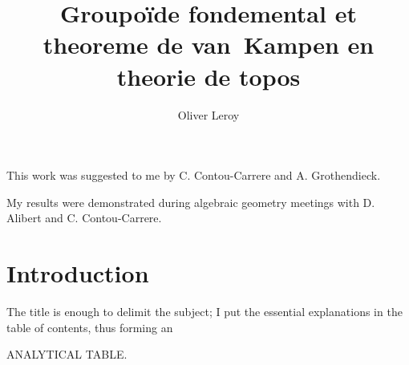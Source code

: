 \documentclass[10pt,oneside]{amsart}
\newcommand{\oldpage}[1]{\marginnote{\textbf{#1}}}
\begin{document}
\title{Groupo\"ide fondemental et theoreme de van~Kampen en theorie de topos}
\author{Oliver Leroy}
\maketitle

\begin{center}
This work was suggested to me by C. Contou-Carrere and A. Grothendieck.

My results were demonstrated during algebraic geometry meetings with D. Alibert and C. Contou-Carrere.
\end{center}

\section*{Introduction}
\oldpage{I}
The title is enough to delimit the subject; I put the essential explanations in the table of contents, thus
forming an
\begin{center}
ANALYTICAL TABLE.
\end{center}
\end{document}

